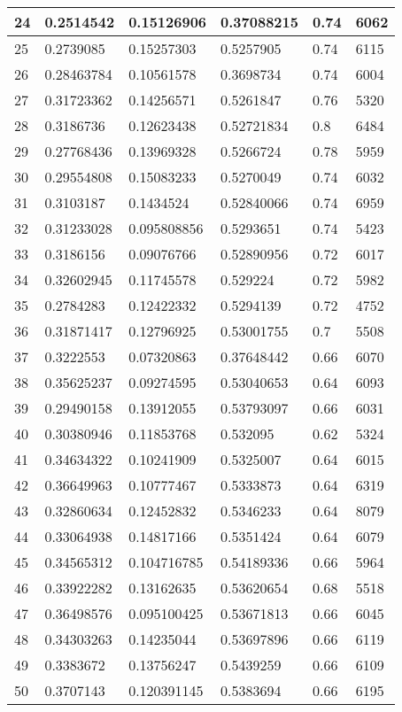 \begin{longtable}{|l|l|l|l|l|l|}
24 & 0.2514542 & 0.15126906 & 0.37088215 & 0.74 & 6062 \\ \hline 
25 & 0.2739085 & 0.15257303 & 0.5257905 & 0.74 & 6115 \\ \hline 
26 & 0.28463784 & 0.10561578 & 0.3698734 & 0.74 & 6004 \\ \hline 
27 & 0.31723362 & 0.14256571 & 0.5261847 & 0.76 & 5320 \\ \hline 
28 & 0.3186736 & 0.12623438 & 0.52721834 & 0.8 & 6484 \\ \hline 
29 & 0.27768436 & 0.13969328 & 0.5266724 & 0.78 & 5959 \\ \hline 
30 & 0.29554808 & 0.15083233 & 0.5270049 & 0.74 & 6032 \\ \hline 
31 & 0.3103187 & 0.1434524 & 0.52840066 & 0.74 & 6959 \\ \hline 
32 & 0.31233028 & 0.095808856 & 0.5293651 & 0.74 & 5423 \\ \hline 
33 & 0.3186156 & 0.09076766 & 0.52890956 & 0.72 & 6017 \\ \hline 
34 & 0.32602945 & 0.11745578 & 0.529224 & 0.72 & 5982 \\ \hline 
35 & 0.2784283 & 0.12422332 & 0.5294139 & 0.72 & 4752 \\ \hline 
36 & 0.31871417 & 0.12796925 & 0.53001755 & 0.7 & 5508 \\ \hline 
37 & 0.3222553 & 0.07320863 & 0.37648442 & 0.66 & 6070 \\ \hline 
38 & 0.35625237 & 0.09274595 & 0.53040653 & 0.64 & 6093 \\ \hline 
39 & 0.29490158 & 0.13912055 & 0.53793097 & 0.66 & 6031 \\ \hline 
40 & 0.30380946 & 0.11853768 & 0.532095 & 0.62 & 5324 \\ \hline 
41 & 0.34634322 & 0.10241909 & 0.5325007 & 0.64 & 6015 \\ \hline 
42 & 0.36649963 & 0.10777467 & 0.5333873 & 0.64 & 6319 \\ \hline 
43 & 0.32860634 & 0.12452832 & 0.5346233 & 0.64 & 8079 \\ \hline 
44 & 0.33064938 & 0.14817166 & 0.5351424 & 0.64 & 6079 \\ \hline 
45 & 0.34565312 & 0.104716785 & 0.54189336 & 0.66 & 5964 \\ \hline 
46 & 0.33922282 & 0.13162635 & 0.53620654 & 0.68 & 5518 \\ \hline 
47 & 0.36498576 & 0.095100425 & 0.53671813 & 0.66 & 6045 \\ \hline 
48 & 0.34303263 & 0.14235044 & 0.53697896 & 0.66 & 6119 \\ \hline 
49 & 0.3383672 & 0.13756247 & 0.5439259 & 0.66 & 6109 \\ \hline 
50 & 0.3707143 & 0.120391145 & 0.5383694 & 0.66 & 6195 \\ \hline 
\end{longtable}